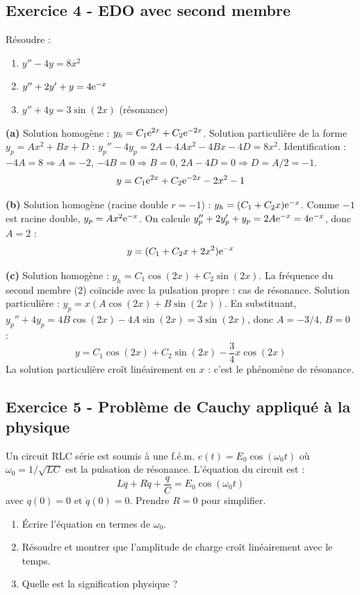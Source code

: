 \documentclass[12pt,a4paper]{article}
\begin{document}
\subsection*{Exercice 4 - EDO avec second membre \niveau{\moyen}}

\begin{boiteexercice}
Résoudre :
\begin{enumerate}[label=(\alph*)]
  \item $y'' - 4y = 8x^2$
  \item $y'' + 2y' + y = 4\mathrm{e}^{-x}$
  \item $y'' + 4y = 3\sin(2x)$ (résonance)
\end{enumerate}
\end{boiteexercice}

\begin{boitecorrige}
\textbf{(a)} Solution homogène : $y_h = C_1\mathrm{e}^{2x} + C_2\mathrm{e}^{-2x}$. Solution particulière de la forme $y_p = Ax^2 + Bx + D$ :
$y_p'' - 4y_p = 2A - 4Ax^2 - 4Bx - 4D = 8x^2$.
Identification : $-4A = 8 \Rightarrow A=-2$, $-4B=0 \Rightarrow B=0$, $2A-4D = 0 \Rightarrow D = A/2 = -1$.
\[
y = C_1\mathrm{e}^{2x} + C_2\mathrm{e}^{-2x} - 2x^2 - 1
\]

\textbf{(b)} Solution homogène (racine double $r=-1$) : $y_h = (C_1+C_2 x)\mathrm{e}^{-x}$. Comme $-1$ est racine double, $y_p = Ax^2\mathrm{e}^{-x}$. On calcule $y_p'' + 2y_p' + y_p = 2A\mathrm{e}^{-x} = 4\mathrm{e}^{-x}$, donc $A = 2$ :
\[
y = (C_1 + C_2 x + 2x^2)\mathrm{e}^{-x}
\]

\textbf{(c)} Solution homogène : $y_h = C_1\cos(2x) + C_2\sin(2x)$. La fréquence du second membre ($2$) coïncide avec la pulsation propre : cas de résonance. Solution particulière : $y_p = x(A\cos(2x)+B\sin(2x))$. En substituant, $y_p'' + 4y_p = 4B\cos(2x) - 4A\sin(2x) = 3\sin(2x)$, donc $A = -3/4$, $B = 0$ :
\[
y = C_1\cos(2x) + C_2\sin(2x) - \frac{3}{4}x\cos(2x)
\]
La solution particulière croît linéairement en $x$ : c'est le phénomène de résonance.
\end{boitecorrige}

\subsection*{Exercice 5 - Problème de Cauchy appliqué à la physique \niveau{\difficile}}

\begin{boiteexercice}
Un circuit RLC série est soumis à une f.é.m. $e(t) = E_0\cos(\omega_0 t)$ où $\omega_0 = 1/\sqrt{LC}$ est la pulsation de résonance. L'équation du circuit est :
\[
L\ddot{q} + R\dot{q} + \frac{q}{C} = E_0\cos(\omega_0 t)
\]
avec $q(0) = 0$ et $\dot{q}(0) = 0$. Prendre $R = 0$ pour simplifier.

\begin{enumerate}
  \item Écrire l'équation en termes de $\omega_0$.
  \item Résoudre et montrer que l'amplitude de charge croît linéairement avec le temps.
  \item Quelle est la signification physique ?
\end{enumerate}
\end{boiteexercice}
\end{document}
